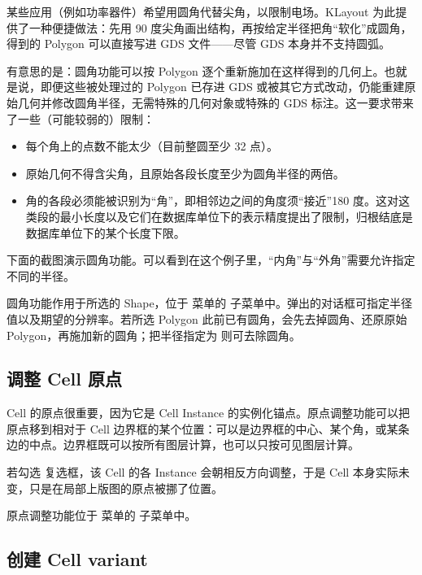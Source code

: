 某些应用（例如功率器件）希望用圆角代替尖角，以限制电场。KLayout 为此提供了一种便捷做法：先用 90 度尖角画出结构，再按给定半径把角“软化”成圆角，得到的 Polygon 可以直接写进 GDS 文件——尽管 GDS 本身并不支持圆弧。

有意思的是：圆角功能可以按 Polygon 逐个重新施加在这样得到的几何上。也就是说，即便这些被处理过的 Polygon 已存进 GDS 或被其它方式改动，仍能重建原始几何并修改圆角半径，无需特殊的几何对象或特殊的 GDS 标注。这一要求带来了一些（可能较弱的）限制：

\begin{itemize}
\item 每个角上的点数不能太少（目前整圆至少 32 点）。
\item 原始几何不得含尖角，且原始各段长度至少为圆角半径的两倍。
\item 角的各段必须能被识别为“角”，即相邻边之间的角度须“接近”180 度。这对这类段的最小长度以及它们在数据库单位下的表示精度提出了限制，归根结底是数据库单位下的某个长度下限。
\end{itemize}

下面的截图演示圆角功能。可以看到在这个例子里，“内角”与“外角”需要允许指定不同的半径。


圆角功能作用于所选的 Shape，位于  菜单的  子菜单中。弹出的对话框可指定半径值以及期望的分辨率。若所选 Polygon 此前已有圆角，会先去掉圆角、还原原始 Polygon，再施加新的圆角；把半径指定为  则可去除圆角。

\subsection{调整 Cell 原点}\label{sec:adjust_origin}

Cell 的原点很重要，因为它是 Cell Instance 的实例化锚点。原点调整功能可以把原点移到相对于 Cell 边界框的某个位置：可以是边界框的中心、某个角，或某条边的中点。边界框既可以按所有图层计算，也可以只按可见图层计算。

若勾选  复选框，该 Cell 的各 Instance 会朝相反方向调整，于是 Cell 本身实际未变，只是在局部上版图的原点被挪了位置。

原点调整功能位于  菜单的  子菜单中。

\subsection{创建 Cell variant}\label{sec:create_variants}

